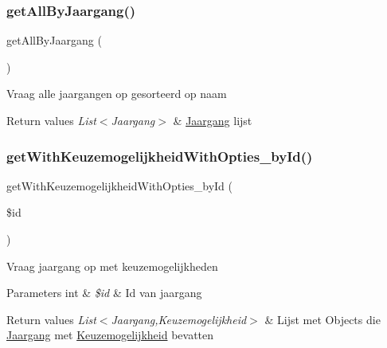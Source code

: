 \subsubsection{\texorpdfstring{get\+All\+By\+Jaargang()}{getAllByJaargang()}}
{\footnotesize\ttfamily get\+All\+By\+Jaargang (\begin{DoxyParamCaption}{ }\end{DoxyParamCaption})}

Vraag alle jaargangen op gesorteerd op naam 
\begin{DoxyRetVals}{Return values}
{\em List$<$\+Jaargang$>$} & \mbox{\hyperlink{class_jaargang}{Jaargang}} lijst \\
\hline
\end{DoxyRetVals}
\mbox{\label{class_jaargang__model_a4cee3ea918a63f7849b377135e365d35}} 
\subsubsection{\texorpdfstring{get\+With\+Keuzemogelijkheid\+With\+Opties\+\_\+by\+Id()}{getWithKeuzemogelijkheidWithOpties\_byId()}}
{\footnotesize\ttfamily get\+With\+Keuzemogelijkheid\+With\+Opties\+\_\+by\+Id (\begin{DoxyParamCaption}\item[{}]{\$id }\end{DoxyParamCaption})}

Vraag jaargang op met keuzemogelijkheden 
\begin{DoxyParams}[1]{Parameters}
int & {\em \$id} & Id van jaargang \\
\hline
\end{DoxyParams}

\begin{DoxyRetVals}{Return values}
{\em List$<$\+Jaargang,Keuzemogelijkheid$>$} & Lijst met Objects die \mbox{\hyperlink{class_jaargang}{Jaargang}} met \mbox{\hyperlink{class_keuzemogelijkheid}{Keuzemogelijkheid}} bevatten \\
\hline
\end{DoxyRetVals}
\mbox{\label{class_jaargang__model_a95dd2c7c418df525016de428cc3d1743}} 
